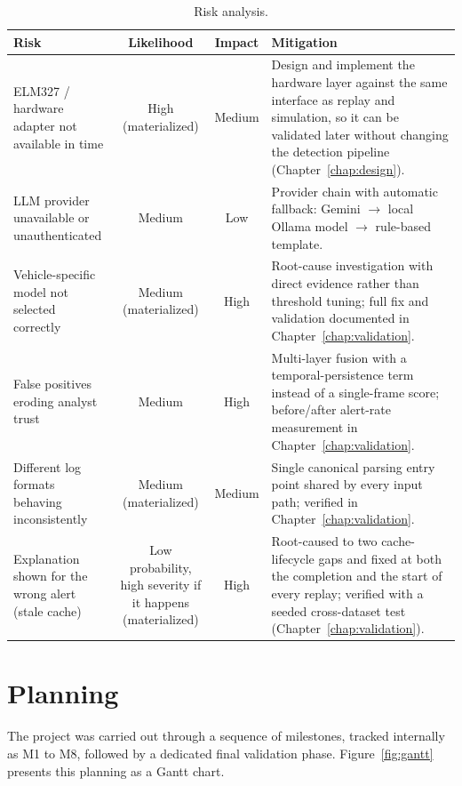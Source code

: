 \begin{table}[H]
\centering
\caption{Risk analysis.}
\label{tab:risks}
\begin{tabularx}{\textwidth}{@{}lccX@{}}
\toprule
\textbf{Risk} & \textbf{Likelihood} & \textbf{Impact} & \textbf{Mitigation} \\
\midrule
ELM327 / hardware adapter not available in time & High (materialized) & Medium & Design and implement the hardware layer against the same interface as replay and simulation, so it can be validated later without changing the detection pipeline (Chapter~\ref{chap:design}). \\
LLM provider unavailable or unauthenticated & Medium & Low & Provider chain with automatic fallback: Gemini $\rightarrow$ local Ollama model $\rightarrow$ rule-based template. \\
Vehicle-specific model not selected correctly & Medium (materialized) & High & Root-cause investigation with direct evidence rather than threshold tuning; full fix and validation documented in Chapter~\ref{chap:validation}. \\
False positives eroding analyst trust & Medium & High & Multi-layer fusion with a temporal-persistence term instead of a single-frame score; before/after alert-rate measurement in Chapter~\ref{chap:validation}. \\
Different log formats behaving inconsistently & Medium (materialized) & Medium & Single canonical parsing entry point shared by every input path; verified in Chapter~\ref{chap:validation}. \\
Explanation shown for the wrong alert (stale cache) & Low probability, high severity if it happens (materialized) & High & Root-caused to two cache-lifecycle gaps and fixed at both the completion and the start of every replay; verified with a seeded cross-dataset test (Chapter~\ref{chap:validation}). \\
\bottomrule
\end{tabularx}
\end{table}

\section{Planning}

The project was carried out through a sequence of milestones, tracked internally as M1 to M8, followed by a dedicated final validation phase. Figure~\ref{fig:gantt} presents this planning as a Gantt chart.

